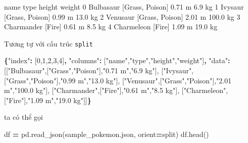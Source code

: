 \documentclass[
]{book}
\newenvironment{Shaded}{\begin{snugshade}}{\end{snugshade}}
\newcommand{\DataTypeTok}[1]{\textcolor[rgb]{0.13,0.29,0.53}{#1}}
\newcommand{\DecValTok}[1]{\textcolor[rgb]{0.00,0.00,0.81}{#1}}
\newcommand{\FunctionTok}[1]{\textcolor[rgb]{0.13,0.29,0.53}{\textbf{#1}}}
\newcommand{\NormalTok}[1]{#1}
\newcommand{\OperatorTok}[1]{\textcolor[rgb]{0.81,0.36,0.00}{\textbf{#1}}}
\newcommand{\OtherTok}[1]{\textcolor[rgb]{0.56,0.35,0.01}{#1}}
\newcommand{\StringTok}[1]{\textcolor[rgb]{0.31,0.60,0.02}{#1}}
\begin{document}
\begin{Shaded}
\begin{Highlighting}[]
\NormalTok{         name             type  height    weight}
\NormalTok{0   Bulbasaur  [Grass, Poison]  0.71 m    6.9 kg}
\NormalTok{1     Ivysaur  [Grass, Poison]  0.99 m   13.0 kg}
\NormalTok{2    Venusaur  [Grass, Poison]  2.01 m  100.0 kg}
\NormalTok{3  Charmander           [Fire]  0.61 m    8.5 kg}
\NormalTok{4  Charmeleon           [Fire]  1.09 m   19.0 kg}
\end{Highlighting}
\end{Shaded}

Tương tự với cấu trúc \texttt{split}

\begin{Shaded}
\begin{Highlighting}[]
\FunctionTok{\{}\DataTypeTok{"index"}\FunctionTok{:}   \OtherTok{[}\DecValTok{0}\OtherTok{,}\DecValTok{1}\OtherTok{,}\DecValTok{2}\OtherTok{,}\DecValTok{3}\OtherTok{,}\DecValTok{4}\OtherTok{]}\FunctionTok{,}
 \DataTypeTok{"columns"}\FunctionTok{:} \OtherTok{[}\StringTok{"name"}\OtherTok{,}\StringTok{"type"}\OtherTok{,}\StringTok{"height"}\OtherTok{,}\StringTok{"weight"}\OtherTok{]}\FunctionTok{,}
 \DataTypeTok{"data"}\FunctionTok{:}    \OtherTok{[[}\StringTok{"Bulbasaur"}\OtherTok{,[}\StringTok{"Grass"}\OtherTok{,}\StringTok{"Poison"}\OtherTok{],}\StringTok{"0.71 m"}\OtherTok{,}\StringTok{"6.9 kg"}\OtherTok{],}
             \OtherTok{[}\StringTok{"Ivysaur"}\OtherTok{,[}\StringTok{"Grass"}\OtherTok{,}\StringTok{"Poison"}\OtherTok{],}\StringTok{"0.99 m"}\OtherTok{,}\StringTok{"13.0 kg"}\OtherTok{],}
             \OtherTok{[}\StringTok{"Venusaur"}\OtherTok{,[}\StringTok{"Grass"}\OtherTok{,}\StringTok{"Poison"}\OtherTok{],}\StringTok{"2.01 m"}\OtherTok{,}\StringTok{"100.0 kg"}\OtherTok{],}
             \OtherTok{[}\StringTok{"Charmander"}\OtherTok{,[}\StringTok{"Fire"}\OtherTok{],}\StringTok{"0.61 m"}\OtherTok{,}\StringTok{"8.5 kg"}\OtherTok{],}
             \OtherTok{[}\StringTok{"Charmeleon"}\OtherTok{,[}\StringTok{"Fire"}\OtherTok{],}\StringTok{"1.09 m"}\OtherTok{,}\StringTok{"19.0 kg"}\OtherTok{]]}\FunctionTok{\}}
\end{Highlighting}
\end{Shaded}

ta có thể gọi

\begin{Shaded}
\begin{Highlighting}[]
\NormalTok{df }\OperatorTok{=}\NormalTok{ pd.read\_json(}\StringTok{\textquotesingle{}sample\_pokemon.json\textquotesingle{}}\NormalTok{, orient}\OperatorTok{=}\StringTok{\textquotesingle{}split\textquotesingle{}}\NormalTok{)}
\NormalTok{df.head()}
\end{Highlighting}
\end{Shaded}
\end{document}
